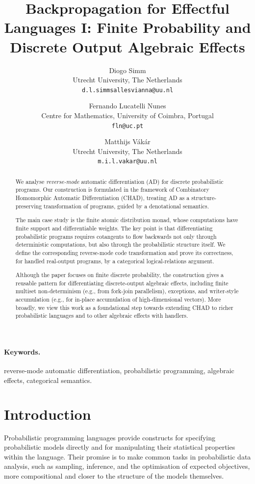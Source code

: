 \documentclass[11pt,a4paper]{article}
\title{Backpropagation for Effectful Languages I: Finite Probability and Discrete Output Algebraic Effects}
\author{Diogo Simm\\
  Utrecht University, The Netherlands\\
  \texttt{d.l.simmsallesvianna@uu.nl}
  \and
  Fernando Lucatelli Nunes\\
  Centre for Mathematics, University of Coimbra, Portugal\\
  \texttt{fln@uc.pt}
  \and
  Matthijs V\'ak\'ar\\
  Utrecht University, The Netherlands\\
  \texttt{m.i.l.vakar@uu.nl}}
\date{}
\theoremstyle{definition}
\theoremstyle{remark}
\begin{document}
\maketitle

\begin{abstract}
We analyse \textit{reverse-mode} automatic differentiation (AD) for discrete probabilistic programs. Our construction is formulated in the framework of Combinatory Homomorphic Automatic Differentiation (CHAD), treating AD as a structure-preserving transformation of programs, guided by a denotational semantics.

	The main case study is the finite atomic distribution monad, whose computations have finite support and differentiable weights. The key point is that differentiating probabilistic programs requires cotangents to flow backwards not only through deterministic computations, but also through the probabilistic structure itself. We define the corresponding reverse-mode code transformation and prove its correctness, for handled real-output programs, by a categorical logical-relations argument.

	Although the paper focuses on finite discrete probability, the construction gives a reusable pattern for differentiating discrete-output algebraic effects, including finite multiset non-determinism (e.g., from fork-join parallelism), exceptions, and writer-style accumulation (e.g., for in-place accumulation of high-dimensional vectors). More broadly, we view this work as a foundational step towards extending CHAD to richer probabilistic languages and to other algebraic effects with handlers.
\end{abstract}

\paragraph{Keywords.} reverse-mode automatic differentiation, probabilistic programming, algebraic effects, categorical semantics.

\section{Introduction}

Probabilistic programming languages provide constructs for specifying
probabilistic models directly and for manipulating their statistical
properties within the language. Their promise is to make common tasks in
probabilistic data analysis, such as sampling, inference, and the optimisation
of expected objectives, more compositional and closer to the structure of the
models themselves.
\end{document}
